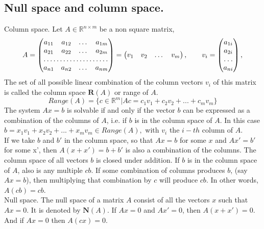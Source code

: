 \documentclass[a4paper,10pt]{report}
\begin{document}
\subsection{Null space and column space.}
Column space. Let $A \in \mathbb{R}^{n \times m}$ be a non square matrix,
\begin{equation*}
A
=
\begin{pmatrix}
a_{11} & a_{12} & \dots & a_{1m}\\
a_{21} & a_{22} & \dots & a_{2m}\\
\hdotsfor{4}\\
a_{n1} & a_{n2} & \dots &a_{nm}
\end{pmatrix}
=\begin{pmatrix}
v_{1} & v_{2} & \dots & v_{m}\\
\end{pmatrix}, \qquad v_i=
\begin{pmatrix}
a_{1i} \\
a_{2i} \\
\hdotsfor{1}\\
a_{ni} 
\end{pmatrix},
\end{equation*}
The set of all possible linear combination of the column vectors $v_i$ 
of this matrix is called 
the column space $\mathbf{R}(A)$ or range of $A$.
$$
Range(A)=\{c\in\mathbb{R}^m|Ac=c_1v_1+c_2v_2+...+c_mv_m  \}
$$
The system $Ax=b$ is solvable if and only if the vector $b$ can be expressed as a
combination of the columns of $A$, i.e. if $b$ is in the column space of $A$. In this case
$b=x_1v_1+x_2v_2+...+x_mv_m \in Range(A),$ with $v_i$ the $i-th$ column of $A$.\\
If we take $b$ and $b'$ in the column space, so that $Ax=b$ for some $x$ and $Ax'=b'$ for
some x', then $A(x+x')=b+b'$ is also a combination of the columns. The column space
of all vectors $b$ is closed under addition.
If $b$ is in the column space of $A$, also is any multiple $cb$. If some combination
of columns produces $b$, (say $Ax=b$), then multiplying that combination by $c$
will produce $cb$. In other words, $A(cb)=cb$.\\
Null space. The null space of a matrix $A$ consist of all the vectors $x$ such that 
$Ax=0$. It is denoted by $\mathbf{N}(A)$.
If $Ax=0$ and $Ax'=0$, then $A(x+x')=0$. And if $Ax=0$ then $A(cx)=0$.
\end{document}
